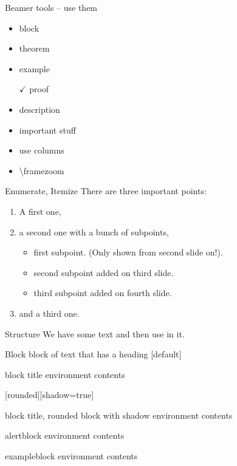 \begin{frame}{Beamer tools -- use them}
  \begin{itemize}
  \item block
  \item theorem
  \item<2> example
  \item[$\checkmark$] proof
  \item description
  \item \alert{important stuff}
  \item use columns
  \item \textbackslash{}framezoom
  \end{itemize}
\end{frame}


\begin{frame}{Enumerate, Itemize}
  There are three important points:
  \begin{enumerate}
    \item<1-> A first one,
    \item<2-> a second one with a bunch of subpoints,
  \begin{itemize}
    \item first subpoint. (Only shown from second slide on!).
    \item<3-> second subpoint added on third slide.
    \item<4-> third subpoint added on fourth slide.
  \end{itemize}
    \item<5-> and a third one.
  \end{enumerate}
\end{frame}


\begin{frame}{Structure}
  We have some text and then use  in it.
\end{frame}

\begin{frame}{Block}
  block of text that has a heading
  [default]
  \begin{block}{block title}
  environment contents
  \end{block}
  [rounded][shadow=true]
  \begin{block}{block title, rounded block with shadow}
  environment contents
  \end{block}
  \begin{alertblock}{alertblock}
  environment contents
  \end{alertblock}
  \begin{exampleblock}{exampleblock}
  environment contents
  \end{exampleblock}
\end{frame}


